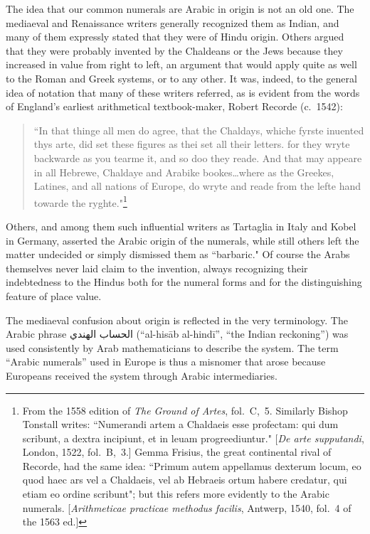 \documentclass[11pt,a4paper]{article}
\newcommand{\ar}[1]{{\arabicfont #1}}
\newenvironment{enhancednote}{%
  \begin{tcolorbox}[colback=enhancedbg,colframe=notecolor,boxrule=1pt,
    left=10pt,right=10pt,top=8pt,bottom=8pt,
    title={\textbf{Enhanced Edition Note}},fonttitle=\bfseries\color{notecolor}]
}{\end{tcolorbox}}
\begin{document}
The idea that our common numerals are Arabic in origin is not an old one. The mediaeval and Renaissance writers generally recognized them as Indian, and many of them expressly stated that they were of Hindu origin. Others argued that they were probably invented by the Chaldeans or the Jews because they increased in value from right to left, an argument that would apply quite as well to the Roman and Greek systems, or to any other. It was, indeed, to the general idea of notation that many of these writers referred, as is evident from the words of England's earliest arithmetical textbook-maker, Robert Recorde (c.~1542):

\begin{quote}
``In that thinge all men do agree, that the Chaldays, whiche fyrste inuented thys arte, did set these figures as thei set all their letters. for they wryte backwarde as you tearme it, and so doo they reade. And that may appeare in all Hebrewe, Chaldaye and Arabike bookes\ldots where as the Greekes, Latines, and all nations of Europe, do wryte and reade from the lefte hand towarde the ryghte."\footnote{From the 1558 edition of \textit{The Ground of Artes}, fol.~C,~5. Similarly Bishop Tonstall writes: ``Numerandi artem a Chaldaeis esse profectam: qui dum scribunt, a dextra incipiunt, et in leuam progreediuntur." [\textit{De arte supputandi}, London, 1522, fol.~B,~3.] Gemma Frisius, the great continental rival of Recorde, had the same idea: ``Primum autem appellamus dexterum locum, eo quod haec ars vel a Chaldaeis, vel ab Hebraeis ortum habere credatur, qui etiam eo ordine scribunt"; but this refers more evidently to the Arabic numerals. [\textit{Arithmeticae practicae methodus facilis}, Antwerp, 1540, fol.~4 of the 1563 ed.]}
\end{quote}

Others, and among them such influential writers as Tartaglia in Italy and Kobel in Germany, asserted the Arabic origin of the numerals, while still others left the matter undecided or simply dismissed them as ``barbaric." Of course the Arabs themselves never laid claim to the invention, always recognizing their indebtedness to the Hindus both for the numeral forms and for the distinguishing feature of place value.

\begin{enhancednote}
The mediaeval confusion about origin is reflected in the very terminology. The Arabic phrase \ar{الحساب الهندي} (``al-his\=ab al-hind\=i'', ``the Indian reckoning'') was used consistently by Arab mathematicians to describe the system. The term ``Arabic numerals'' used in Europe is thus a misnomer that arose because Europeans received the system through Arabic intermediaries.
\end{enhancednote}
\end{document}
